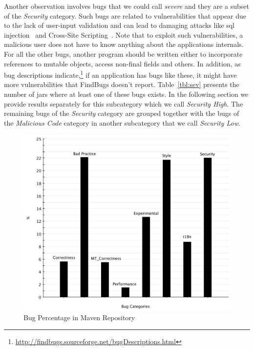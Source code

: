 \documentclass[conference]{llncs}
\begin{document}
Another observation involves bugs that we could call {\it
severe} and they are a subset of the {\it Security} category.
Such bugs are related to vulnerabilities that appear due to the lack of user-input
validation and can lead to damaging attacks like {\sc sql} injection~\cite{RL12} and
Cross-Site Scripting~\cite{WS08}. Note that to exploit such vulnerabilities, a malicious user does
not have to know anything about the applications internals. For all the other
bugs, another program should be written either to incorporate references to
mutable objects, access non-final fields and others. In addition, as
bug descriptions indicate,\footnote{\url{http://findbugs.sourceforge.net/bugDescriptions.html}}
if an application has bugs like these, it might have more vulnerabilities that FindBugs doesn't
report. Table~\ref{tbl:sev} presents the number of {\sc jar}s where at least one of these
bugs exists. In the following section we provide results separately for this
subcategory which we call {\it Security High}. The remaining bugs of the {\it Security} category
are grouped together with the bugs of the {\it Malicious Code} category in another subcategory that
we call {\it Security Low}.

\begin{figure}
	\centering
	\includegraphics[scale=0.6]{bug_percent}
	\caption{Bug Percentage in Maven Repository}
	\label{fig:bug-per} 
\end{figure}
\end{document}
